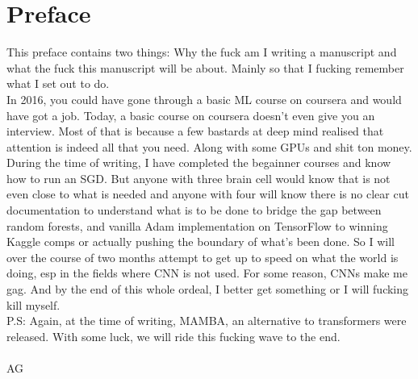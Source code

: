 \chapterspaceabove{6.25cm} %
\chapterspacebelow{8.5cm} %

\chapter*{Preface}
 
This preface contains two things: Why the fuck am I writing a manuscript and what the fuck this manuscript will be about. Mainly so that I fucking remember what I set out to do.\\

In 2016, you could have gone through a basic ML course on coursera and would have got a job. Today, a basic course on coursera doesn't even give you an interview. Most of that is because a few bastards at deep mind realised that attention is indeed all that you need. Along with some GPUs and shit ton money. During the time of writing, I have completed the begainner courses and know how to run an SGD. But anyone with three brain cell would know that is not even close to what is needed and anyone with four will know there is no clear cut documentation to understand what is to be done to bridge the gap between random forests, and vanilla Adam implementation on TensorFlow to winning Kaggle  comps or actually pushing the boundary of what's been done. So I will over the course of two months attempt to get up to speed on what the world is doing, esp in the fields where CNN is not used. For some reason, CNNs make me gag. And by the end of this whole ordeal, I better get something or I will fucking kill myself.  \\

P.S: Again, at the time of writing, MAMBA, an alternative to transformers were released. With some luck, we will ride this fucking wave to the end. \\\\

AG